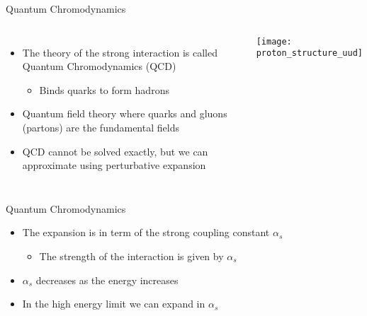 \begin{frame}{Quantum Chromodynamics}

\vspace*{\titleskip}

\begin{columns}[T,onlytextwidth]
	\begin{itemize}

		\item The theory of the {strong interaction} is called {Quantum Chromodynamics (QCD)}
		
		\begin{itemize}
		\item Binds quarks to form hadrons 
		\end{itemize}

		\item Quantum field theory where quarks and gluons (partons) are the fundamental fields
		
		\item QCD cannot be solved exactly, but we can approximate using perturbative expansion
		
	
	\end{itemize}
	\vspace*{0pt}
	\texttt{[image: proton\_structure\_uud]}
\end{columns}


\end{frame}


\begin{frame}{Quantum Chromodynamics}

\vspace*{\titleskip}

\begin{itemize}
	\item The expansion is in term of the strong coupling constant $\alpha_s$
	
	\begin{itemize}
	\item The strength of the interaction is given by $\alpha_s$
	\end{itemize}

	
	\item $\alpha_s$ decreases as the  energy increases
	
	\item In the high energy limit we can expand in $\alpha_s$
	
\end{itemize}

\end{frame}

